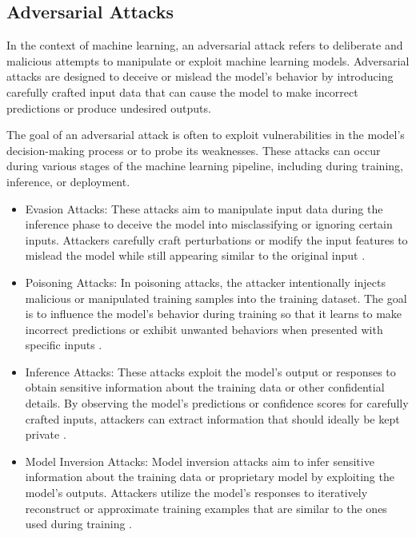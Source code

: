 \documentclass[conference]{IEEEtran}
\begin{document}
\subsection{Adversarial Attacks}

In the context of machine learning, an adversarial attack refers to deliberate and malicious attempts to manipulate or exploit machine learning models. Adversarial attacks are designed to deceive or mislead the model's behavior by introducing carefully crafted input data that can cause the model to make incorrect predictions or produce undesired outputs.

The goal of an adversarial attack is often to exploit vulnerabilities in the model's decision-making process or to probe its weaknesses. These attacks can occur during various stages of the machine learning pipeline, including during training, inference, or deployment.

\label{attacks}
\begin{itemize}
    \item Evasion Attacks: These attacks aim to manipulate input data during the inference phase to deceive the model into misclassifying or ignoring certain inputs. Attackers carefully craft perturbations or modify the input features to mislead the model while still appearing similar to the original input \cite{biggio_evasion_2013, carlini_towards_2017, adversarialpatch, pixelattack, hopskipjump}.
    \item Poisoning Attacks: In poisoning attacks, the attacker intentionally injects malicious or manipulated training samples into the training dataset. The goal is to influence the model's behavior during training so that it learns to make incorrect predictions or exhibit unwanted behaviors when presented with specific inputs \cite{biggio_poisoning_2013, saha2020hidden}.
    \item Inference Attacks: These attacks exploit the model's output or responses to obtain sensitive information about the training data or other confidential details. By observing the model's predictions or confidence scores for carefully crafted inputs, attackers can extract information that should ideally be kept private \cite{chakraborty_adversarial_2018, orekondy2019knockoff}.
    \item Model Inversion Attacks: Model inversion attacks aim to infer sensitive information about the training data or proprietary model by exploiting the model's outputs. Attackers utilize the model's responses to iteratively reconstruct or approximate training examples that are similar to the ones used during training \cite{chakraborty_adversarial_2018, choquette2021label, li2021membership}.
\end{itemize}
\end{document}
